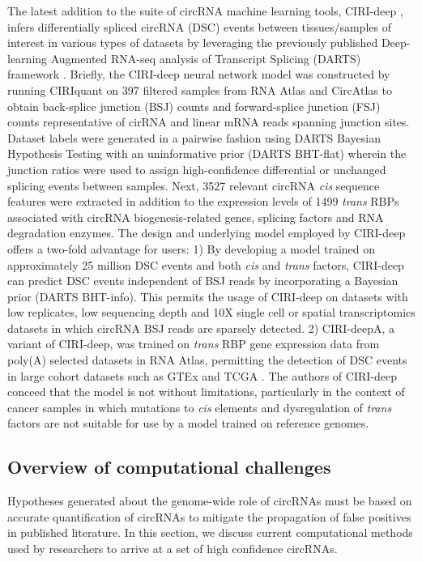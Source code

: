 \documentclass[pdflatex,sn-mathphys-num]{sn-jnl}
\begin{document}
The latest addition to the suite of circRNA machine learning tools, CIRI-deep \cite{CIRIdeep}, infers differentially spliced circRNA (DSC) events between tissues/samples of interest in various types of datasets by leveraging the previously published Deep-learning Augmented RNA-seq analysis of Transcript Splicing (DARTS) framework \cite{DARTS}. Briefly, the CIRI-deep neural network model was constructed by running CIRIquant \cite{CIRIquant} on 397 filtered samples from RNA Atlas \cite{RNAAtlas} and CircAtlas \cite{circatlas} to obtain back-splice junction (BSJ) counts and forward-splice junction (FSJ) counts representative of cirRNA and linear mRNA reads spanning junction sites. Dataset labels were generated in a pairwise fashion using DARTS Bayesian Hypothesis Testing with an uninformative prior (DARTS BHT-flat) wherein the junction ratios were used to assign high-confidence differential or unchanged splicing events between samples. Next, 3527 relevant circRNA \textit{cis} sequence features were extracted in addition to the expression levels of 1499 \textit{trans} RBPs associated with circRNA biogenesis-related genes, splicing factors and RNA degradation enzymes. The design and underlying model employed by CIRI-deep offers a two-fold advantage for users: 1) By developing a model trained on approximately 25 million DSC events and both \textit{cis} and \textit{trans} factors, CIRI-deep can predict DSC events independent of BSJ reads by incorporating a Bayesian prior (DARTS BHT-info). This permits the usage of CIRI-deep on datasets with low replicates, low sequencing depth and 10X single cell or spatial transcriptomics datasets in which circRNA BSJ reads are sparsely detected. 2) CIRI-deepA, a variant of CIRI-deep, was trained on \textit{trans} RBP gene expression data from poly(A) selected datasets in RNA Atlas, permitting the detection of DSC events in large cohort datasets such as GTEx \cite{GTExConsortium2013Jun} and TCGA \cite{TCGA}. The authors of CIRI-deep conceed that the model is not without limitations, particularly in the context of cancer samples in which mutations to \textit{cis} elements and dysregulation of \textit{trans} factors are not suitable for use by a model trained on reference genomes. 

\subsection{Overview of computational challenges}
Hypotheses generated about the genome-wide role of circRNAs must be based on accurate quantification of circRNAs to mitigate the propagation of false positives in published literature. In this section, we discuss current computational methods used by researchers to arrive at a set of high confidence circRNAs.
\end{document}

